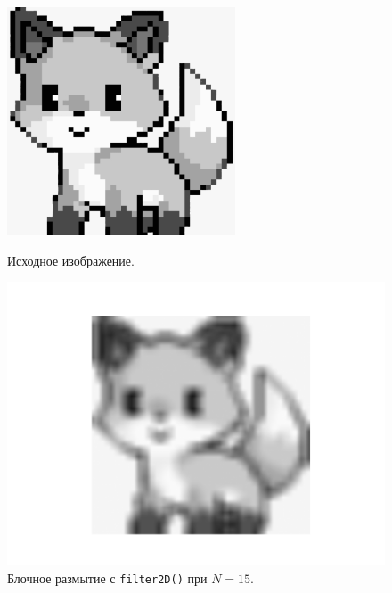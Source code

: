 \documentclass[a4paper]{article}
\begin{document}
\begin{figure}[H]
  \centering
  \begin{minipage}{0.49\textwidth}
    \centering
    \includegraphics[width=\textwidth]{src/grayscale.png}
    \caption{Исходное изображение.}  
  \end{minipage}
  \begin{minipage}{0.49\textwidth}
    \centering
    \includegraphics[width=\textwidth]{src/box_15.png}
    \caption{Блочное размытие с \texttt{filter2D()} при $N=15$.}
  \end{minipage}
\end{figure}
\end{document}

